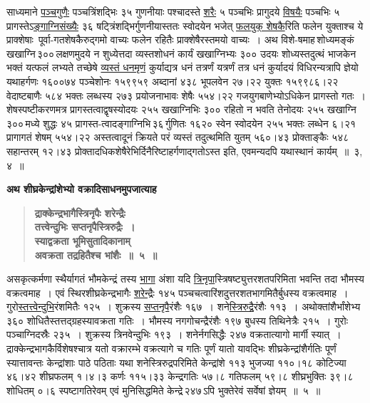 \documentclass[11pt, openany]{book}
\begin{document}
\begin{sloppypar}
\noindent साध्यमाने \hyperref[6.4]{पञ्चगुणैः} पञ्चत्रिंशद्भिः ३५ गुणनीयाः पश्चादस्ते \hyperref[6.4]{शरैः} ५ पञ्चभिः प्रागुदये \hyperref[6.4]{विषयैः} पञ्चभिः ५ प्रागस्तेऽ\hyperref[6.4]{ङ्गाग्निसंख्यैः} ३६ षट्त्रिंशद्भिर्गुणनीयास्ततः स्वोदयेन भजेत् \hyperref[6.4]{फलयुक् शेषकै}रिति फलेन युक्ताश्च ये प्राक्शेषाः~पूर्वा-गतशेषकैरुद्गमो वाच्यः फलेन रहितैः प्राक्शेषैरस्तमयो वाच्यः~। अथ विशे-षमाह\textendash \,शोध्यमङ्कं खखाग्नि\textendash \,३००\textendash \,लक्षणमुदये न शुध्येत्तदा व्यस्तशोधनं कार्यं खखाग्निभ्यः ३०० उदयः शोध्यस्तदुत्थं भाजकेन भक्तं यत्फलं लभ्यते तच्छेषे \hyperref[6.4]{व्यस्तं धनमृणं} कुर्याद्यत्र धनं तत्रर्णं यत्रर्णं तत्र धनं कुर्यादयं विधिरन्यत्रापि ज्ञेयो यथाहर्गणः १६००७४ पञ्चेशोनः १५९९५९ अब्दानां ४३८ भूपलवेन २७।२२ युक्तः १५९९८६।२२ वेदाष्टबाणैः ५८४ भक्तः लब्धस्य २७३ प्रयोजनाभावः शेषैः ५५४।२२ गजयुगबाणेभ्योऽधिकेन प्रागस्तो गतः~। शेषस्पष्टीकरणमत्र प्रागस्तत्वाद्वृषस्योदयः २५५ खखाग्निभिः ३०० रहितो न भवति तेनोदयः २५५ खखाग्नि\textendash \,३००\textendash \,मध्ये शुद्धः ४५ प्रागस्त-त्वादङ्गाग्निभि\textendash \,३६\textendash \,र्गुणितः १६२० स्वेन स्वोदयेन २५५ भक्तः लब्धेन ६।२१ प्रागागतं शेषम् ५५४।२२ अस्तत्वादूनं क्रियते परं व्यस्तं तदुत्थमिति युतम् ५६०।४३ प्रोक्ताङ्कैः ५४८ सहान्तरम् १२।४३ प्रोक्तादधिकशेषैरेभिर्दिनैरिष्टाहर्गणाद्गतोऽस्त इति, एवमन्यदपि यथास्थानं कार्यम्~॥~३, ४~॥
\end{sloppypar}

\newpage

{\small \textbf{अथ शीघ्रकेन्द्रांशेभ्यो वक्रादिसाधनमुपजात्याह\textendash }}

 \label{6.5}
\begin{quote}
{\large \textbf{{\color{purple}द्राक्केन्द्रभागैस्त्रिनृपैः शरेन्द्रैः \\
तत्त्वेन्दुभिः सप्तनृपैस्त्रिरुद्रैः~। \\
स्याद्वक्रता भूमिसुतादिकानाम् \\
अवक्रता तद्रहितैश्च भांशैः~॥~५~॥}}}
\end{quote}

\begin{sloppypar}
असकृत्कर्मणा स्थैर्यागतं भौमकेन्द्रं तस्य \hyperref[6.5]{भागा} अंशा यदि \hyperref[6.5]{त्रिनृपा}स्त्रिषष्ट्युत्तरशतपरिमिता भवन्ति तदा भौमस्य वक्रत्वमाह~। एवं स्थिरशीघ्रकेन्द्रभागैः \hyperref[6.5]{शरेन्द्रैः} १४५ पञ्चचत्वारिंशदुत्तरशतभागमितैर्बुधस्य वक्रत्वमाह~। गुरो\hyperref[6.5]{स्तत्त्वेन्दुभि}रंशमितैः १२५~। शुक्रस्य \hyperref[6.5]{सप्तनृपै}रंशैः १६७~। शने\hyperref[6.5]{स्त्रिरुद्रै}रंशैः ११३~। अथोक्तांशैर्भांशेभ्य ३६० शोधितैस्तत्तद्ग्रहस्यावक्रता गतिः~। भौमस्य नगगोचन्द्रैरंशैः १९७ बुधस्य तिथिनेत्रैः २१५~। गुरोः पञ्चाग्निदस्रैः २३५~। शुक्रस्य त्रिनवेन्दुभिः १९३~। शनेर्नगसिद्धैः २४७ वक्रतात्यागो मार्गी स्यात्~। द्राक्केन्द्रभागकैर्विशेषश्चात्र यतो वक्रारम्भे वक्रत्यागे च गतिः पूर्णं यातो यावद्भिः शीघ्रकेन्द्रांशैर्गतिः पूर्णं स्यात्तावन्तः केन्द्रांशाः पाठे पठिताः यथा शनेस्त्रिरुद्रपरिमिते केन्द्रांशे ११३ भुजज्या ११०।१८ कोटिज्या ४६।४२ शीघ्रफलम् १।४।३ कर्णः ११५।३३ केन्द्रगतिः ५७।८ गतिफलम् ५९।८ शीघ्रभुक्तिः ३९।८ शोधितम् ०।६ स्पष्टागतिरेवम् एवं मुनिसिद्धमिते केन्द्रे\textendash \,२४७\textendash \,ऽपि भुक्तेरेवं सर्वेषां ज्ञेयम्~॥~५~॥
\end{sloppypar}
\end{document}
